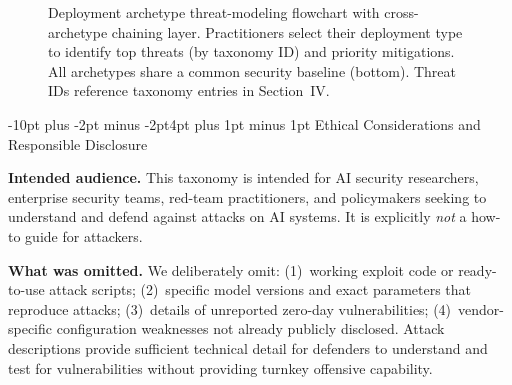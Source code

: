 \documentclass[conference]{IEEEtran}
\makeatletter
\renewcommand{\section}{\@startsection{section}{1}{\z@}%
  {-10pt plus -2pt minus -2pt}{4pt plus 1pt minus 1pt}%
  {\normalfont\large\bfseries\sffamily\color{accentdark}}}
\makeatother
\begin{document}
\begin{figure}[!htbp]
\caption{Deployment archetype threat-modeling flowchart with cross-archetype chaining layer. Practitioners select their deployment type to identify top threats (by taxonomy ID) and priority mitigations. All archetypes share a common security baseline (bottom). Threat IDs reference taxonomy entries in Section~IV.}
\label{fig:deployment_flowchart}
\end{figure}


\section{Ethical Considerations and Responsible Disclosure}\label{sec:ethics}

\textbf{Intended audience.} This taxonomy is intended for AI security researchers, enterprise security teams, red-team practitioners, and policymakers seeking to understand and defend against attacks on AI systems. It is explicitly \emph{not} a how-to guide for attackers.

\textbf{What was omitted.} We deliberately omit: (1)~working exploit code or ready-to-use attack scripts; (2)~specific model versions and exact parameters that reproduce attacks; (3)~details of unreported zero-day vulnerabilities; (4)~vendor-specific configuration weaknesses not already publicly disclosed. Attack descriptions provide sufficient technical detail for defenders to understand and test for vulnerabilities without providing turnkey offensive capability.
\end{document}

